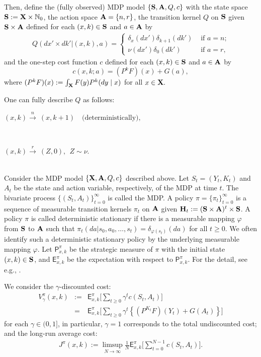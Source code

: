 \documentclass[letterpaper,10pt,conference]{ieeeconf}  %
\def\EE{\mathsf{E}}
\def\PP{\mathsf{P}}
\begin{document}
Then, define the (fully observed) {MDP model $\{{\bf S},{\bf A},Q,c\}$ with the state space
${\bf S} := {\bf X} \times \mathbb N_0$, the action space ${\bf A}=\{n,r\}$, the transition kernel $Q$ on ${\bf S}$ given ${\bf S}\times {\bf A}$ defined for each  $(x,k)\in {\bf S}$ and $a\in {\bf A}$ by
\begin{align*}Q(dx'\times dk'|(x,k),a)=
\begin{cases}
 \delta_x(dx')\delta_{k+1}(dk')& \mbox{ if $a=n$;}\\
\nu(dx')\delta_0(dk')& \mbox{ if $a=r$,}\end{cases}
\end{align*} 
and the one-step cost function {$c$} defined for each $(x,k)\in {\bf S}$ and $a\in {\bf A}$ by
\begin{equation}
\label{eq:stage_cost_xk}
c(x,k;a)= (P^kF)(x) + G(a),
\end{equation} where $(P^k F)(x):=\int_{\bf X}F(y)P^k(dy\mid x)$ for all $x\in{\bf X}.$}

{One can fully describe $Q$ as follows:}\\
\centerline{$(x,k) \xrightarrow{n} \ (x,k+1)\quad\text{(deterministically),}$}\\
\centerline{$(x,k) \xrightarrow{r}  \ (Z,0),\ \ Z\sim \nu.$}\\
{Consider the MDP model $\{{\bf X},{\bf A},Q,c\}$ described above.
Let $S_t=(Y_t,K_t)$ and $A_t$ be the state and action variable, respectively, of the MDP at time $t$. The bivariate process $\{(S_t,A_t)\}_{t=0}^\infty$ is called the MDP. A policy $\pi=\{\pi_t\}_{t=0}^\infty$ is a sequence of measurable transition kernels $\pi_{t}$ on ${\bf A}$ given ${\bf H}_{t}:=({\bf S}\times {\bf A})^{t}\times {\bf S}$.
A policy $\pi$ is called deterministic stationary if there is a measurable mapping $\varphi$ from ${\bf S}$ to ${\bf A}$ such that $\pi_t(da|s_0,a_0,\dots,s_t)=\delta_{\varphi(s_t)}(da)$ for all $t\ge 0.$ We often identify such a deterministic stationary policy by the underlying measurable mapping $\varphi$. Let $\PP_{x,k}^\pi$ be the strategic measure of $\pi$ with the initial state $(x,k)\in {\bf S}$, and $\EE_{x,k}^\pi$ be the expectation with respect to $\PP_{x,k}^\pi.$ For the detail, see e.g., \cite{O89}.} 

{
We consider the $\gamma$-discounted cost:
\begin{eqnarray*}
V^\pi_\gamma(x,k) & := & \EE_{x,k}^\pi\Big[\sum_{t\ge 0} \gamma^t c(S_t,A_t)\Big]\\
 & = & \EE_{x,k}^\pi\Big[\sum_{t\ge 0} \gamma^t \left\{(P^{K_t}F)(Y_t) + G(A_t)\right\} \Big]
\end{eqnarray*}
for each $\gamma\in(0,1]$, in particular, $\gamma=1$ corresponds to the total undiscounted cost;
and the long-run average cost: 
\begin{align*}
J^\pi(x,k):= \limsup_{N\rightarrow \infty}\frac{1}{N}\EE_{x,k}^\pi\Big[\sum_{t=0}^{N-1}  c(S_t,A_t)\Big].
\end{align*}}
\end{document}
